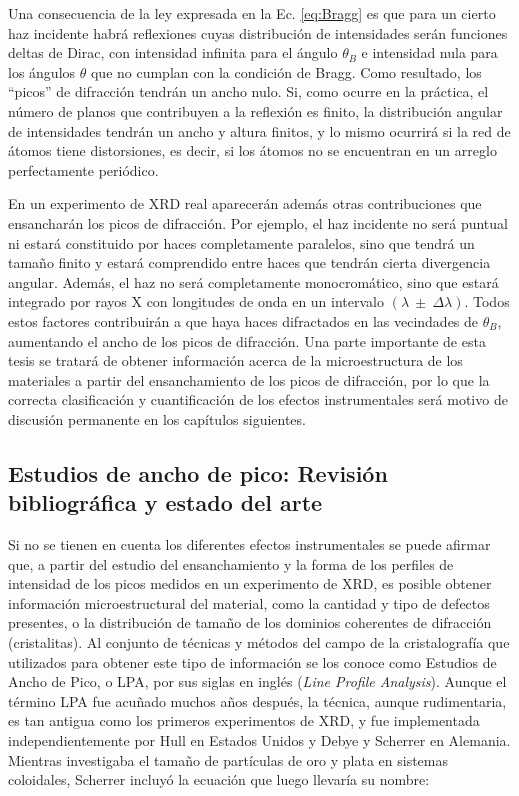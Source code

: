 Una consecuencia de la ley expresada en la Ec. \ref{eq:Bragg} es que para un cierto haz incidente habrá reflexiones cuyas distribución de intensidades serán funciones deltas de Dirac, con intensidad infinita para el ángulo $\theta_{B}$ e intensidad nula para los ángulos $\theta$ que no cumplan con la condición de Bragg. 
Como resultado, los ``picos'' de difracción tendrán un ancho nulo. 
Si, como ocurre en la práctica, el número de planos que contribuyen a la reflexión es finito, la distribución angular de intensidades tendrán un ancho y altura finitos, y lo mismo ocurrirá si la red de átomos tiene distorsiones, es decir, si los átomos no se encuentran en un arreglo perfectamente periódico.

En un experimento de XRD real aparecerán además otras contribuciones que ensancharán los picos de difracción. 
Por ejemplo, el haz incidente no será puntual ni estará constituido por haces completamente paralelos, sino que tendrá un tamaño finito y estará comprendido entre haces que tendrán cierta divergencia angular.
Además, el haz no será completamente monocromático, sino que estará integrado por rayos X con longitudes de onda en un intervalo $(\lambda \ \pm \ \Delta \lambda)$.
Todos estos factores contribuirán a que haya haces difractados en las vecindades de $\theta_{B}$, aumentando el ancho de los picos de difracción. 
Una parte importante de esta tesis se tratará de obtener información acerca de la microestructura de los materiales a partir del ensanchamiento de los picos de difracción, por lo que la correcta clasificación y cuantificación de los efectos instrumentales será motivo de discusión permanente en los capítulos siguientes.

\subsection{Estudios de ancho de pico: Revisión bibliográfica y estado del arte}\label{SS:XRD-LPA} 
Si no se tienen en cuenta los diferentes efectos instrumentales se puede afirmar que, a partir del estudio del ensanchamiento y la forma de los perfiles de intensidad de los picos medidos en un experimento de XRD, es posible obtener información microestructural del material, como la cantidad y tipo de defectos presentes, o la distribución de tamaño de los dominios coherentes de difracción (cristalitas).
Al conjunto de técnicas y métodos del campo de la cristalografía que utilizados para obtener este tipo de información se los conoce como Estudios de Ancho de Pico, o LPA, por sus siglas en inglés (\textit{Line Profile Analysis}).
Aunque el término LPA fue acuñado muchos años después, la técnica, aunque rudimentaria, es tan antigua como los primeros experimentos de XRD, y fue implementada independientemente por Hull en Estados Unidos y Debye y Scherrer en Alemania. 
Mientras investigaba el tamaño de partículas de oro y plata en sistemas coloidales, Scherrer incluyó la ecuación que luego llevaría su nombre\cite{Scherrer1918}:

